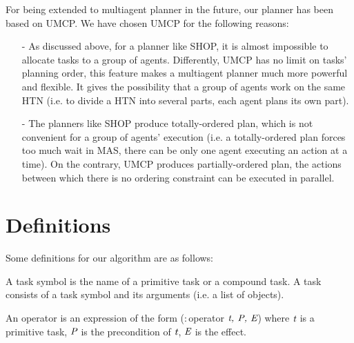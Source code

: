 For being extended to multiagent planner in the future, our planner has been based on UMCP. We have chosen UMCP for the following reasons:
\begin{itemize}
\item[-] As discussed above, for a planner like SHOP, it is almost impossible to allocate tasks to a group of agents.%
Differently, UMCP has no limit on tasks’ planning order, this feature makes a multiagent planner much more powerful and flexible. It gives the possibility that a group of agents work on the same HTN (i.e. to divide a HTN into several parts, each agent plans its own part).
\item[-] The planners like SHOP produce totally-ordered plan, which is not convenient for a group of agents’ execution (i.e. a totally-ordered plan forces too much wait in MAS, there can be only one agent executing an action at a time). On the contrary, UMCP produces partially-ordered plan, the actions between which there is no ordering constraint can be executed in parallel.
\end{itemize}

\section{Definitions}

Some definitions for our algorithm are as follows:
\begin{definition}[Task]
A task symbol is the name of a primitive task or a compound task. 
A task consists of a task symbol and its arguments (i.e. a list of objects).
\end{definition}


\begin{definition}
An operator is an expression of the form ($:$operator $\emph{t, P, E}$) where $\emph{t}$ is a primitive task, $\emph{P}$ is the precondition of $\emph{t}$, $\emph{E}$ is the effect.
\end{definition}

